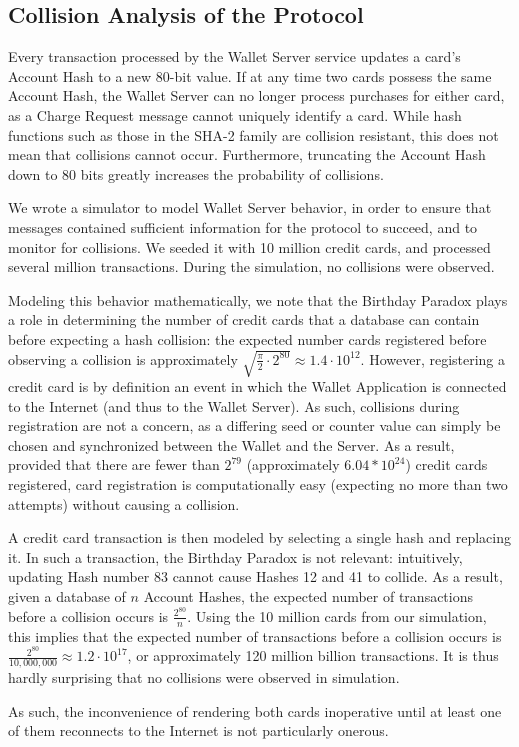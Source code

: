 \subsection{Collision Analysis of the Protocol}
\label{sec:collisions_and_simulations}

Every transaction processed by the Wallet Server service updates a card's Account Hash to a new 80-bit value.
If at any time two cards possess the same Account Hash, the Wallet Server can no longer process purchases for either card,
    as a Charge Request message cannot uniquely identify a card.
While hash functions such as those in the SHA-2 family are collision resistant, this does not mean that collisions cannot occur.
Furthermore, truncating the Account Hash down to 80 bits greatly increases the probability of collisions.

We wrote a simulator to model Wallet Server behavior, in order to ensure that messages contained sufficient information for the protocol to succeed,
    and to monitor for collisions.
We seeded it with 10 million credit cards, and processed several million transactions.
During the simulation, no collisions were observed.

Modeling this behavior mathematically, we note that the Birthday Paradox plays a role in determining the number of credit cards that a database can contain before expecting a hash collision:
the expected number cards registered before observing a collision is approximately
$\sqrt{\frac{\pi}{2} \cdot 2^{80}} \approx 1.4 \cdot 10^{12}$.
However, registering a credit card is by definition an event in which the Wallet Application is connected to the Internet (and thus to the Wallet Server).
As such, collisions during registration are not a concern, as a differing seed or counter value can simply be chosen and synchronized between the Wallet and the Server.
As a result, provided that there are fewer than $2^{79}$ (approximately $6.04 * 10^{24}$) credit cards registered, card registration is computationally easy (expecting no more than two attempts) without causing a collision.

A credit card transaction is then modeled by selecting a single hash and replacing it.
In such a transaction, the Birthday Paradox is not relevant:
intuitively, updating Hash number 83 cannot cause Hashes 12 and 41 to collide.
As a result, given a database of $n$ Account Hashes, the expected number of transactions before a collision occurs is
$\frac{2^{80}}{n}$.
Using the 10 million cards from our simulation, this implies that the expected number of transactions before a collision occurs is
$\frac{2^{80}}{10,000,000} \approx 1.2 \cdot 10 ^ {17}$, or approximately 120 million billion transactions.
It is thus hardly surprising that no collisions were observed in simulation.

As such, the inconvenience of rendering both cards inoperative until at least one of them reconnects to the Internet is not particularly onerous.